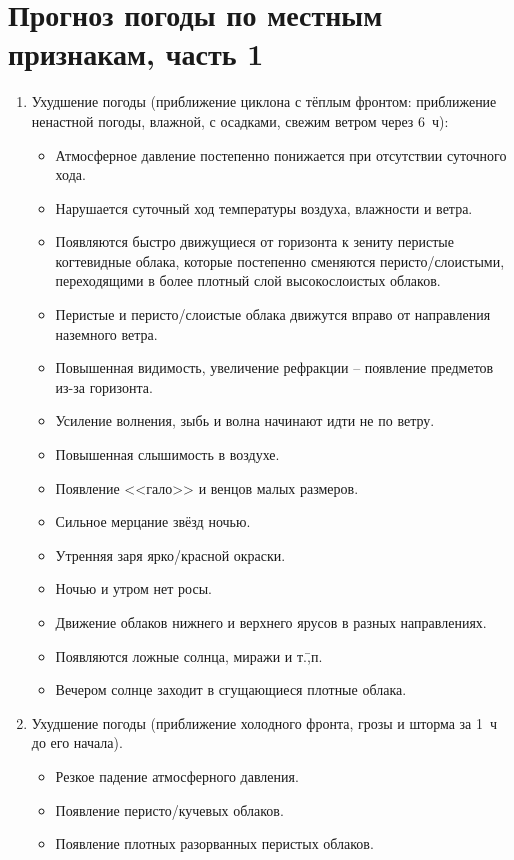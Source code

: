 \section{Прогноз погоды по местным признакам, часть 1}

\begin{enumerate}
\item Ухудшение погоды (приближение циклона с тёплым фронтом:
  приближение ненастной погоды, влажной, с осадками, свежим ветром
  через 6~ч):
  \begin{itemize}
  \item Атмосферное давление постепенно понижается при отсутствии
    суточного хода.
  \item Нарушается суточный ход температуры воздуха, влажности и ветра.
  \item Появляются быстро движущиеся от горизонта к зениту перистые
    когтевидные облака, которые постепенно сменяются
    перисто\-/слоистыми, переходящими в более плотный слой
    высокослоистых облаков.
  \item Перистые и перисто\-/слоистые облака движутся вправо от
    направления наземного ветра.
  \item Повышенная видимость, увеличение рефракции \--- появление
    предметов из-за горизонта.
  \item Усиление волнения, зыбь и волна начинают идти не по ветру.
  \item Повышенная слышимость в воздухе.
  \item Появление <<гало>> и венцов малых размеров.
  \item Сильное мерцание звёзд ночью.
  \item Утренняя заря ярко\-/красной окраски.
  \item Ночью и утром нет росы.
  \item Движение облаков нижнего и верхнего ярусов в разных направлениях.
  \item Появляются ложные солнца, миражи и т.\=,п.
  \item Вечером солнце заходит в сгущающиеся плотные облака.
  \end{itemize}
\item Ухудшение погоды (приближение холодного фронта, грозы и шторма
  за 1~ч до его начала).
  \begin{itemize}
  \item Резкое падение атмосферного давления.
  \item Появление перисто\-/кучевых облаков.
  \item Появление плотных разорванных перистых облаков.

\end{itemize}
\end{enumerate}
